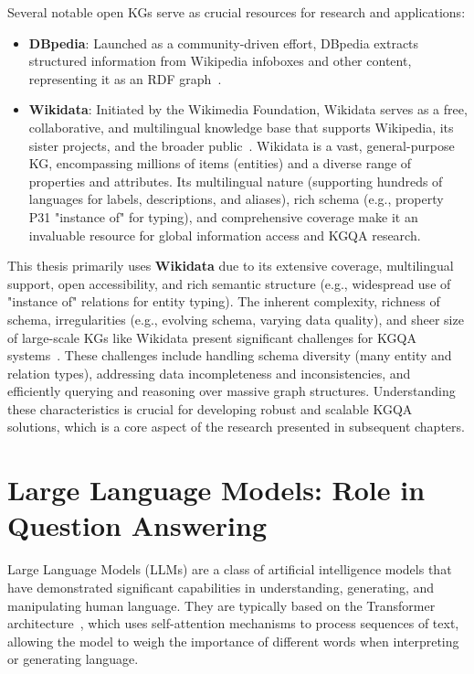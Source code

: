 Several notable open KGs serve as crucial resources for research and applications:
\begin{itemize}
    \item \textbf{DBpedia}: Launched as a community-driven effort, DBpedia extracts structured information from Wikipedia infoboxes and other content, representing it as an RDF graph~\cite{DBLP:journals/ws/BizerLKABCH09, DBLP:conf/semweb/AuerBKLCI07}.
    \item \textbf{Wikidata}: Initiated by the Wikimedia Foundation, Wikidata serves as a free, collaborative, and multilingual knowledge base that supports Wikipedia, its sister projects, and the broader public~\cite{DBLP:journals/cacm/VrandecicK14}. Wikidata is a vast, general-purpose KG, encompassing millions of items (entities) and a diverse range of properties and attributes. Its multilingual nature (supporting hundreds of languages for labels, descriptions, and aliases), rich schema (e.g., property P31 "instance of" for typing), and comprehensive coverage make it an invaluable resource for global information access and KGQA research.
\end{itemize}

This thesis primarily uses \textbf{Wikidata} due to its extensive coverage, multilingual support, open accessibility, and rich semantic structure (e.g., widespread use of "instance of" relations for entity typing). The inherent complexity, richness of schema, irregularities (e.g., evolving schema, varying data quality), and sheer size of large-scale KGs like Wikidata present significant challenges for KGQA systems~\cite{DBLP:conf/akbc/0016P0022}. These challenges include handling schema diversity (many entity and relation types), addressing data incompleteness and inconsistencies, and efficiently querying and reasoning over massive graph structures. Understanding these characteristics is crucial for developing robust and scalable KGQA solutions, which is a core aspect of the research presented in subsequent chapters.

\section{Large Language Models: Role in Question Answering}
\label{sec:rw_llm_fundamentals_qa}

Large Language Models (LLMs) are a class of artificial intelligence models that have demonstrated significant capabilities in understanding, generating, and manipulating human language. They are typically based on the Transformer architecture~\cite{DBLP:conf/nips/VaswaniSPUJGKP17}, which uses self-attention mechanisms to process sequences of text, allowing the model to weigh the importance of different words when interpreting or generating language.

